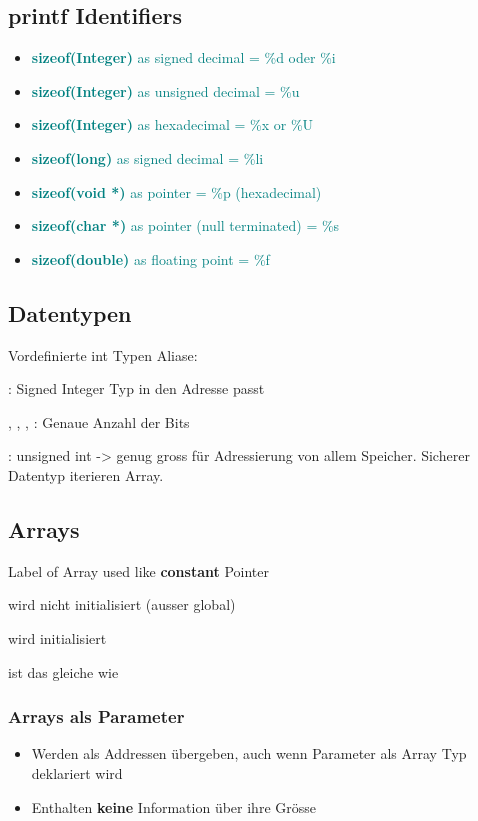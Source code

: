 \begin{multicols*}{4}
\subsection{printf Identifiers}
\begin{itemize}
    \item \textcolor{teal}{\textbf{sizeof(Integer)} as signed decimal = \%d oder \%i}
    \item \textcolor{teal}{\textbf{sizeof(Integer)} as unsigned decimal = \%u}
    \item \textcolor{teal}{\textbf{sizeof(Integer)} as hexadecimal = \%x or \%U}
    \item \textcolor{teal}{\textbf{sizeof(long)} as signed decimal = \%li}
    \item \textcolor{teal}{\textbf{sizeof(void *)} as pointer = \%p (hexadecimal)}
    \item \textcolor{teal}{\textbf{sizeof(char *)} as pointer (null terminated) = \%s}
    \item \textcolor{teal}{\textbf{sizeof(double)} as floating point = \%f}
\end{itemize}

\subsection{Datentypen}
Vordefinierte int Typen Aliase:

: Signed Integer Typ in den Adresse passt

, , , : Genaue Anzahl der Bits

: unsigned int -> genug gross für Adressierung von allem Speicher. Sicherer Datentyp iterieren Array.

\subsection{Arrays}
Label of Array used like \textbf{constant} Pointer

 wird nicht initialisiert (ausser global)

 wird initialisiert

 ist das gleiche wie 

\subsubsection{Arrays als Parameter}
\begin{itemize}
    \item Werden als Addressen übergeben, auch wenn Parameter als Array Typ deklariert wird
    \item Enthalten \textbf{keine} Information über ihre Grösse
\end{itemize}


\end{multicols*}
